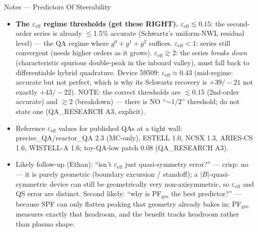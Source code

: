 \documentclass[11pt,aspectratio=169]{beamer}
\begin{document}
\begin{frame}[allowframebreaks]{Notes --- Predictors Of Steerability}
{\begin{itemize}
      truncation error, which scales as $\varepsilon_\text{eff}^{p+1}$ at order $p$
      (QA\_RESEARCH A3).
\item \textbf{The $\varepsilon_\text{eff}$ regime thresholds (get these RIGHT).} $\varepsilon_\text{eff}
      \lesssim 0.15$: the second-order series is already $\le$1.5\% accurate (Schwartz's uniform-NWL
      residual level) --- the QA regime where $g^0+g^1+g^2$ suffices. $\varepsilon_\text{eff}<1$: series
      still convergent (needs higher orders as it grows). $\varepsilon_\text{eff}\gtrsim 2$: the series
      \emph{breaks down} (characteristic spurious double-peak in the inboard valley), must fall back to
      differentiable hybrid quadrature. Device 59509: $\varepsilon_\text{eff}\approx 0.43$ (mid-regime:
      accurate but not perfect, which is why its Schwartz recovery is $+39/-21$ not exactly $+43/-22$).
      NOTE: the correct thresholds are $\lesssim 0.15$ (2nd-order accurate) and $\gtrsim 2$ (breakdown)
      --- there is NO ``$\sim 1/2$'' threshold; do not state one (QA\_RESEARCH A3, explicit).
\item Reference $\varepsilon_\text{eff}$ values for published QAs at a tight wall: precise\_QA/reactor\_QA
      2.3 (MC-only), ESTELL 1.0, NCSX 1.3, ARIES-CS 1.6, WISTELL-A 1.6; toy-QA-low patch 0.08
      (QA\_RESEARCH A3).
\item Likely follow-up (Ethan): ``isn't $\varepsilon_\text{eff}$ just quasi-symmetry error?'' --- crisp:
      no --- it is purely geometric (boundary excursion / standoff); a $|B|$-quasi-symmetric device can
      still be geometrically very non-axisymmetric, so $\varepsilon_\text{eff}$ and QS error are
      distinct. Second likely: ``why is PF$_\text{geo}$ the best predictor?'' --- because SPF can only
      flatten peaking that geometry already bakes in; PF$_\text{geo}$ measures exactly that headroom,
      and the benefit tracks headroom rather than plasma shape.
\end{itemize}
}
\end{frame}
\end{document}
